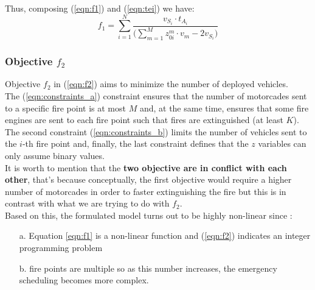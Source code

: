 Thus, composing (\ref{eqn:f1}) and (\ref{eqn:tei}) we have:
\begin{equation}
    f_1 = \sum_{i=1}^N \dfrac{v_{S_i}\cdot t_{A_i}}{\biggr(\sum_{m=1}^M z_{0i}^m \cdot v_m - 2v_{S_i} \biggl)}
\end{equation}

\subsubsection{Objective $f_2$}
Objective $f_2$ in (\ref{eqn:f2}) aims to minimize the number of deployed vehicles.\\
The (\ref{eqn:constraints_a}) constraint ensures that the number of motorcades sent to a specific fire point is at most $M$ and, at the same time, ensures that some fire engines are sent to each fire point such that fires are extinguished (at least $K$).\\
The second constraint (\ref{eqn:constraints_b}) limits the number of vehicles sent to the $i$-th fire point and, finally, the last constraint defines that the $z$ variables can only assume binary values.\\
It is worth to mention that the \textbf{two objective are in conflict with each other}, that's because conceptually, the first objective would require a higher number of motorcades in order to faster extinguishing the fire but this is in contrast with what we are trying to do with $f_2$.\\
Based on this, the formulated model turns out to be highly non-linear since :
\begin{itemize}
    \item[a.] Equation \ref{eqn:f1} is a non-linear function and (\ref{eqn:f2}) indicates an integer programming problem
    \item[b.] fire points are multiple so as this number increases, the emergency scheduling becomes more complex.
\end{itemize}
